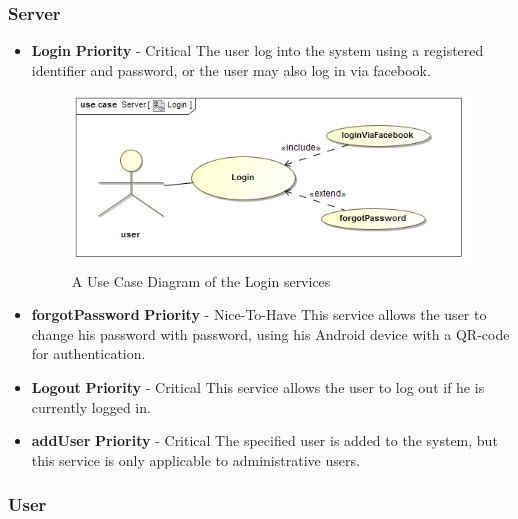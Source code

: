 \documentclass{article}
\begin{document}
		\subsubsection{Server}
			\begin{itemize}
			\item \textbf{Login}
				\newline\textbf{ Priority } - Critical
				\newline The user log into the system using a registered identifier and password, or the user may also log in via facebook.
	
		\begin{figure}[H]	
 			 \centering
			  \includegraphics[width=12cm]{LoginUseCase}
		 	 \caption{A Use Case Diagram of the Login services}
		\end{figure}
		\item\textbf{forgotPassword}
				\newline\textbf{ Priority } - Nice-To-Have
				\newline This service allows the user to change his password with password, using his Android device with a QR-code for authentication.
		\item \textbf{Logout}
				\newline\textbf{ Priority } - Critical
				\newline This service allows the user to log out if he is currently logged in.
			\item \textbf{addUser}
				\newline\textbf{ Priority } - Critical
				\newline The specified user is added to the system, but this service is only applicable to administrative users. 
			\end{itemize}
		\subsubsection{User}
\end{document}
